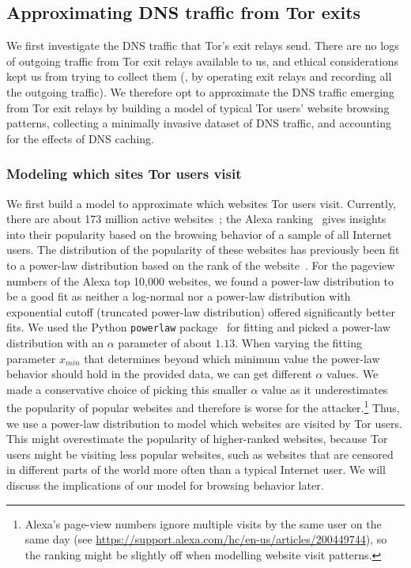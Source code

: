 \subsection{Approximating DNS traffic from Tor exits}
\label{sec:attack:sim}

We first investigate the DNS traffic that Tor's exit relays send.
There are no logs of outgoing traffic
from Tor exit relays available to us, and ethical considerations kept us
from trying to collect them (\eg, by operating exit relays and recording
all the outgoing traffic). We therefore opt to approximate the DNS traffic
emerging from Tor exit relays by \first building a model of typical Tor
users' website browsing patterns, \second collecting a minimally invasive
dataset of DNS traffic, and \third accounting for the effects of DNS caching.

\subsubsection{Modeling which sites Tor users visit}
\label{sec:attack:pop}

We first build a model to approximate {which websites} Tor users visit.
Currently, there are about 173 million active
websites~\cite{numberofwebsites}; the Alexa ranking~\cite{alexatop1k}
gives insights into their popularity based on the browsing behavior of
a sample of all Internet users. The distribution of the popularity of
these websites has previously been fit to a power-law distribution based
on the rank of the
website~\cite{DBLP:journals/network/MahantiCMAW13,ClausetSN09,AliS07}.
For the pageview numbers of the Alexa top 10,000 websites, we found a
power-law distribution to be a good fit as neither a log-normal nor a
power-law distribution with exponential cutoff (truncated power-law
distribution) offered significantly better fits.
We used the Python {\tt powerlaw} package~\cite{power-law} for fitting and
picked a power-law distribution with an $\alpha$ parameter of about $1.13$.
When varying the fitting parameter $x_{min}$ that determines beyond which
minimum value the power-law behavior should hold in the provided data, we can
get different $\alpha$ values. We made a conservative choice of picking this
smaller $\alpha$ value as it underestimates the popularity of popular websites
and therefore is worse for the attacker.\footnote{Alexa's page-view numbers
ignore multiple visits by the same user on the same day (see
\url{https://support.alexa.com/hc/en-us/articles/200449744}), so the ranking
might be slightly off when modelling website visit patterns.}
Thus, we use a power-law distribution to model which websites are
visited by Tor users. This might overestimate the popularity of
higher-ranked websites, because Tor users might be visiting less popular
websites, such as websites that are censored in different parts of the
world more often than a typical Internet user. We will discuss the
implications of our model for browsing behavior later.


